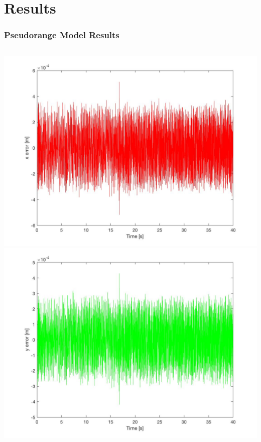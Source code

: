 \documentclass{beamer}
\begin{document}
\section{Results}		
	\begin{frame}
		\frametitle{Pseudorange Model Results}
		\begin{columns}[t]
			\centering
			\includegraphics[scale= 0.12]{x_error.jpg}\\
			\includegraphics[scale= 0.12]{y_error.jpg}

\end{columns}
\end{frame}
\end{document}
